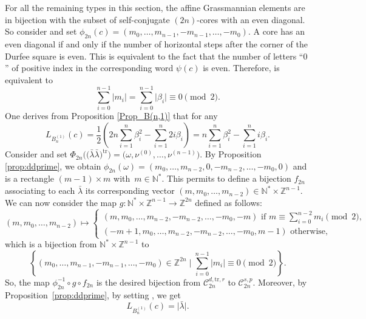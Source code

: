 \documentclass[10pt,a4paper]{amsart}
\numberwithin{equation}{section}
\newcommand{\cC}{\mathcal{C}}
\newcommand{\Z}{\mathbb{Z}}
\newcommand{\N}{\mathbb{N}}
\begin{document}
For all the remaining types in this section, the affine Grassmannian
elements are in bijection with the subset \smash{$\cC_{2n}^{s,p}$} of self-conjugate
$(2n)$-cores with an even diagonal. So consider \smash{$c\in \cC_{2n}^{s,p}$} and set  $%
\phi _{2n}(c)=(m_{0},\dots ,m_{n-1},-m_{n-1},\dots ,-m_{0})$. A core has an
even diagonal if and only if the number of horizontal steps after the corner
of the Durfee square is even. This is equivalent to the fact that the number
of letters ``$0$'' of positive index in the corresponding word $\psi (c)$ is
even. Therefore, \smash{$c\in \cC_{2n}^{s,p}$} is equivalent to
\begin{equation*}
\sum_{i=0}^{n-1}\lvert m_{i}\rvert =\sum_{i=0}^{n-1}\lvert \beta _{i}\rvert
\equiv 0\pmod{2}.
\end{equation*}%
One derives from Proposition \ref{Prop_B(n,1)} that for any 
\begin{equation*}
L_{B_{n}^{(1)}}(c)=\frac{1}{2}\left( 2n\sum_{i=1}^{n}\beta
_{i}^{2}-\sum_{i=1}^{n}2i\beta _{i}\right) =n\sum_{i=1}^{n}\beta
_{i}^{2}-\sum_{i=1}^{n}i\beta _{i}.
\end{equation*}%
Consider \smash{$\bar{\lambda}\in \cC_{2n}^{d,\mathrm{tr},r}$} and set $\Phi _{2n}\bigl(\bigl(%
\bar{\lambda}\bar{\lambda}\bigr)^{\mathrm{tr}}\bigr)=\bigl( \omega ,\nu ^{(0)},\dots
,\nu ^{(n-1)}\bigr)$. By Proposition \ref{prop:ddprime}, we obtain  $\phi
_{2n}(\omega )=(m_{0},\dots ,m_{n-2},0,-m_{n-2},\dots ,-m_{0},0)$ and  is a rectangle $(m-1)\times m$ with~${m\in \N^{\ast }}$. This
permits to define a bijection $f_{2n}$ associating to each $\bar{\lambda}$
its corresponding vector $(m,m_{0},\dots ,m_{n-2})\in \N^{\ast }\times \Z%
^{n-1}$.
We can now consider the map $g\colon \N^{\ast }\times \Z^{n-1} \rightarrow  \Z^{2n} $ defined as follows:
\begin{equation*}
 (m,m_{0},\dots ,m_{n-2})  \mapsto
\begin{cases}
\displaystyle (m,m_{0},\dots ,m_{n-2},-m_{n-2},\dots ,-m_{0},-m)\text{ if }m\equiv
\sum_{i=0}^{n-2}m_{i}\pmod{2}, \\
(-m+1,m_{0},\dots ,m_{n-2},-m_{n-2},\dots ,-m_{0},m-1)\text{ otherwise,}
\end{cases}
\end{equation*}%
which is a bijection from $\N^{\ast }\times \Z^{n-1}$ to
\begin{equation*}
\left\{(m_{0},\dots ,m_{n-1},-m_{n-1},\dots ,-m_{0})\in \Z^{2n}\mid
\sum_{i=0}^{n-1}\lvert m_{i}\rvert \equiv 0\pmod{2}\right\}.
\end{equation*}%
So, the map $\phi _{2n}^{-1}\circ g\circ f_{2n}$ is the desired bijection
from $\cC_{2n}^{d,\mathrm{tr},r}$ to $\cC_{2n}^{s,p}$. Moreover, by
Proposition~\ref{prop:ddprime}, by setting , we get
\begin{equation*}
L_{B_{n}^{(1)}}(c)=\bigl\lvert \bar{\lambda}\bigr\rvert .
\end{equation*}
\end{document}
